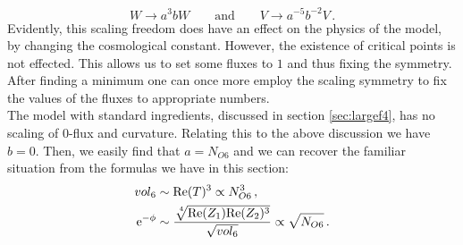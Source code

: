 \documentclass[a4paper,12pt]{report}
\newcommand{\be}{\begin{equation}}
\newcommand{\ee}{\end{equation}}
\newcommand{\bea}{\begin{equation}\begin{aligned}}
\newcommand{\eea}{\end{aligned}\end{equation}}
\def\rme{{\rm e}}
\def\rmre{{\rm Re}}
\begin{document}
\be 
W \to a^ 3 b W \qquad \text{and} \qquad V \to a^ {-5}b^ {-2} V\,.
\ee
Evidently, this scaling freedom does have an effect on the physics of the model, by changing the cosmological constant. However, the existence of critical points is not effected. This allows us to set some fluxes to $1$ and thus fixing the symmetry. After finding a minimum one can once more employ the scaling symmetry to fix the values of the fluxes to appropriate numbers.\\
The model with standard ingredients, discussed in section \ref{sec:largef4}, has no scaling of $0$-flux and curvature. Relating this to the above discussion we have $b=0$. Then, we easily find that $a =N_{O6}$ and we can recover the familiar situation from the formulas we have in this section:
\bea 
vol_6 &\sim \rmre(T)^ 3 \propto N^ 3_{O6}\,,\\
\rme^ {-\phi} &\sim \frac{\sqrt[\leftroot{-2}\uproot{2} 4]{\rmre(Z_1)\rmre(Z_2)^ 3}}{\sqrt{vol_6}} \propto \sqrt{N_{O6}}\,.
\eea
\end{document}
